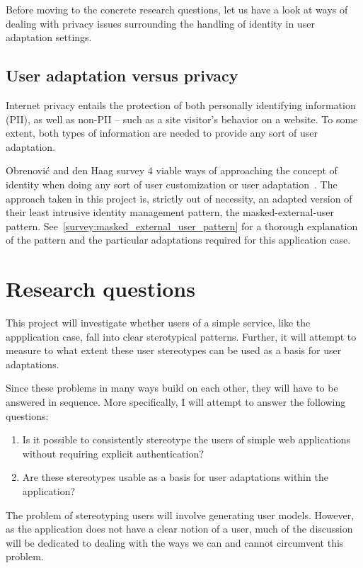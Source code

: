   Before moving to the concrete research questions, let us have a look at ways of dealing with privacy issues surrounding the handling of identity in user adaptation settings.

  \subsection{User adaptation versus privacy}
  \label{intro:adaptation_vs_privacy}

    Internet privacy entails the protection of both personally identifying information (PII), as well as non-PII -- such as a site visitor's behavior on a website. To some extent, both types of information are needed to provide any sort of user adaptation.

    Obrenović and den Haag survey 4 viable ways of approaching the concept of identity when doing any sort of user customization or user adaptation~\cite{Obrenovic2012}. The approach taken in this project is, strictly out of necessity, an adapted version of their least intrusive identity management pattern, the masked-external-user pattern. See~\ref{survey:masked_external_user_pattern} for a thorough explanation of the pattern and the particular adaptations required for this application case.

\section{Research questions}
\label{intro:research_questions}

  This project will investigate whether users of a simple service, like the appplication case, fall into clear sterotypical patterns. Further, it will attempt to measure to what extent these user stereotypes can be used as a basis for user adaptations.

  Since these problems in many ways build on each other, they will have to be answered in sequence. More specifically, I will attempt to answer the following questions:

  \begin{enumerate}
    \item Is it possible to consistently stereotype the users of simple web applications without requiring explicit authentication?
    \item Are these stereotypes usable as a basis for user adaptations within the application?
  \end{enumerate}

  The problem of stereotyping users will involve generating user models. However, as the application does not have a clear notion of a user, much of the discussion will be dedicated to dealing with the ways we can and cannot circumvent this problem.

